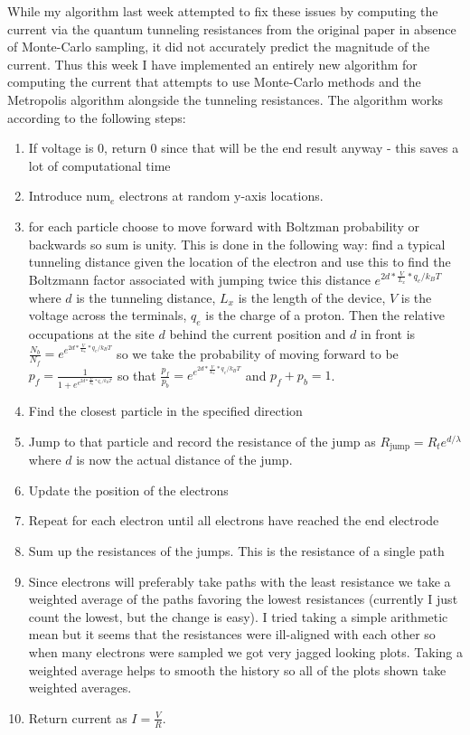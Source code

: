 \documentclass{article}
\theoremstyle{definition} %
\begin{document}
While my algorithm last week attempted to fix these issues by computing the current via the quantum tunneling resistances from the original paper in absence of Monte-Carlo sampling, it did not accurately predict the magnitude of the current. Thus this week I have implemented an entirely new algorithm for computing the current that attempts to use Monte-Carlo methods and the Metropolis algorithm alongside the tunneling resistances. The algorithm works according to the following steps:
\begin{enumerate}
\item If voltage is 0, return 0 since that will be the end result anyway - this saves a lot of computational time
\item Introduce num$_e$ electrons at random y-axis locations.
\item for each particle choose to move forward with Boltzman probability or backwards so sum is unity. This is done in the following way: find a typical tunneling distance given the location of the electron and use this to find the Boltzmann  factor associated with jumping twice this distance $e^{2d*\frac{V}{L_x}*q_e/k_BT}$ where $d$ is the tunneling distance, $L_x$ is the length of the device, $V$ is the voltage across the terminals, $q_e$ is the charge of a proton. Then the relative occupations at the site $d$ behind the current position and $d$ in front is $\frac{N_b}{N_f} = e^{e^{2d*\frac{V}{L_x}*q_e/k_BT}}$ so we take the probability of moving forward to be $p_f = \frac{1}{1+e^{e^{2d*\frac{V}{L_x}*q_e/k_BT}}}$ so that $\frac{p_f}{p_b} = e^{e^{2d*\frac{V}{L_x}*q_e/k_BT}}$ and $p_f + p_b = 1$.
\item Find the closest particle in the specified direction
\item Jump to that particle and record the resistance of the jump as $R_{\text{jump}} = R_t e^{d/\lambda}$ where $d$ is now the actual distance of the jump.
\item Update the position of the electrons
\item Repeat for each electron until all electrons have reached the end electrode
\item Sum up the resistances of the jumps. This is the resistance of a single path
\item Since electrons will preferably take paths with the least resistance we take a weighted average of the paths favoring the lowest resistances (currently I just count the lowest, but the change is easy). I tried taking a simple arithmetic mean but it seems that the resistances were ill-aligned with each other so when many electrons were sampled we got very jagged looking plots. Taking a weighted average helps to smooth the history so all of the plots shown take weighted averages.
\item Return current as $I = \frac{V}R$.
\end{enumerate}
\end{document}
